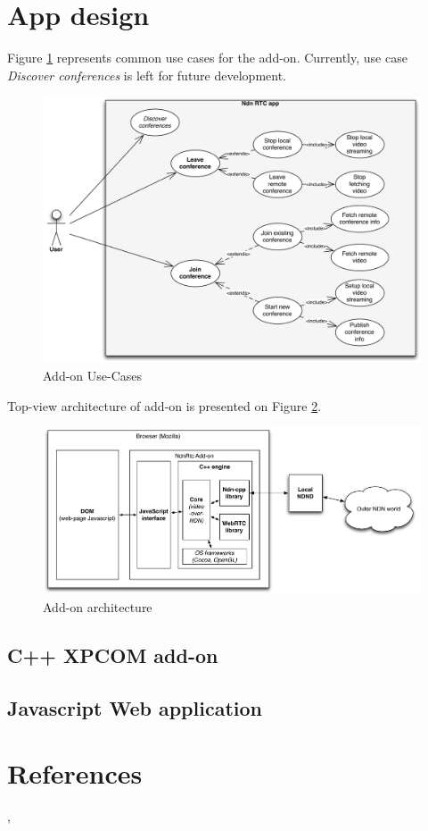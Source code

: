 \documentclass[12pt]{article}
\begin{document}
\section{App design}
Figure \ref{fig:uc} represents common use cases for the add-on. Currently, use case \textit{Discover conferences} is left for future development.
\begin{figure}
\centering
\includegraphics[width=\textwidth]{../res/graphics/addon-uc}
\caption{Add-on Use-Cases}
\label{fig:uc}
\end{figure}


Top-view architecture of add-on is presented on Figure \ref{fig:arch}.
\begin{figure}
\centering
\includegraphics[width=\textwidth]{../res/graphics/addon-arch}
\caption{Add-on architecture}
\label{fig:arch}
\end{figure}

\subsection{C++ XPCOM add-on}

\subsection{Javascript Web application}

\section{References} \cite{videoTR}, \cite{ChronosTR}


\end{document}
